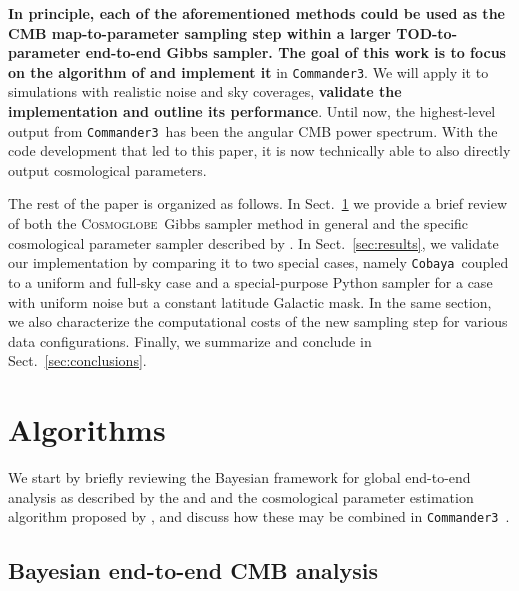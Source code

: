 \documentclass[twocolumn]{aa}
\def\commanderthree{\texttt{Commander3}}
\def\cobaya{\texttt{Cobaya}}
\newcommand{\cosmoglobe}{\textsc{Cosmoglobe}}
\begin{document}
\textbf{In principle, each of the aforementioned methods could be used as the CMB map-to-parameter sampling step within a larger TOD-to-parameter end-to-end Gibbs sampler. The goal of this work is to focus on the algorithm of \citet{racine:2016} and implement it} in \commanderthree. We will apply it to simulations with realistic noise and sky coverages, \textbf{validate the implementation and outline its performance}. Until now, the highest-level output from \commanderthree\ has been the angular CMB power spectrum. With the code development that led to this paper, it is now technically able to also directly output cosmological parameters.

The rest of the paper is organized as follows. In Sect.~\ref{sec:methods} we provide a brief review of both the \cosmoglobe\ Gibbs sampler method in general and the specific cosmological parameter sampler described by \citet{racine:2016}. In Sect.~\ref{sec:results}, we validate our implementation by comparing it to two special cases, namely \cobaya\ coupled to a uniform and full-sky case and a special-purpose Python sampler for a case with uniform noise but a constant latitude Galactic mask. In the same section, we also characterize the computational costs of the new sampling step for various data configurations. Finally, we summarize and conclude in Sect.~\ref{sec:conclusions}.

\section{Algorithms}
\label{sec:methods}

We start by briefly reviewing the Bayesian framework for global end-to-end analysis as described by the \citet{bp01} and \citet{watts2023_dr1} and the cosmological parameter estimation algorithm proposed by \citet{racine:2016}, and discuss how these may be combined in \commanderthree\ \citep{bp03}.

\subsection{Bayesian end-to-end CMB analysis}
\end{document}
